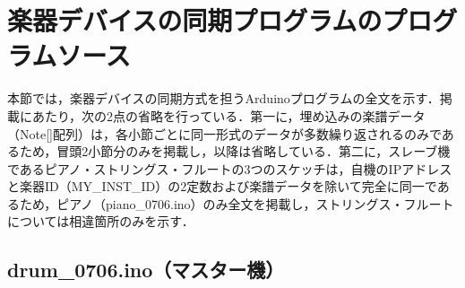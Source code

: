 \section{楽器デバイスの同期プログラムのプログラムソース}
\label{sec:apndx_douki}
本節では，楽器デバイスの同期方式を担うArduinoプログラムの全文を示す．掲載にあたり，次の2点の省略を行っている．第一に，埋め込みの楽譜データ（Note[]配列）は，各小節ごとに同一形式のデータが多数繰り返されるのみであるため，冒頭2小節分のみを掲載し，以降は省略している．第二に，スレーブ機であるピアノ・ストリングス・フルートの3つのスケッチは，自機のIPアドレスと楽器ID（MY\_INST\_ID）の2定数および楽譜データを除いて完全に同一であるため，ピアノ（piano\_0706.ino）のみ全文を掲載し，ストリングス・フルートについては相違箇所のみを示す．

\subsection{drum\_0706.ino（マスター機）}

